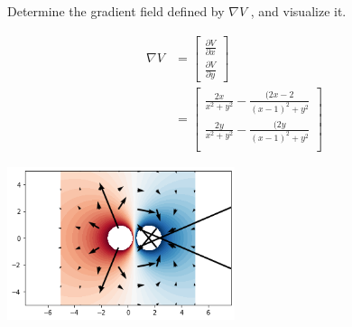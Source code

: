 Determine the gradient field defined by $\nabla V$ , and visualize it.

\begin{solution}
\begin{align*}
    \nabla V &= \begin{bmatrix} \frac{\partial V}{\partial x} \\ \frac{\partial V}{\partial y} \end{bmatrix} \\
    &= \begin{bmatrix}
        \frac{2x}{x^2 + y^2} - \frac{(2x - 2}{(x - 1)^2 + y^2} \\
        \frac{2y}{x^2 + y^2} - \frac{(2y}{(x - 1)^2 + y^2} \\
    \end{bmatrix}
\end{align*}

\begin{center}
    \includegraphics[width=0.5\textwidth]{img/e10p2.png}
\end{center}
\end{solution}